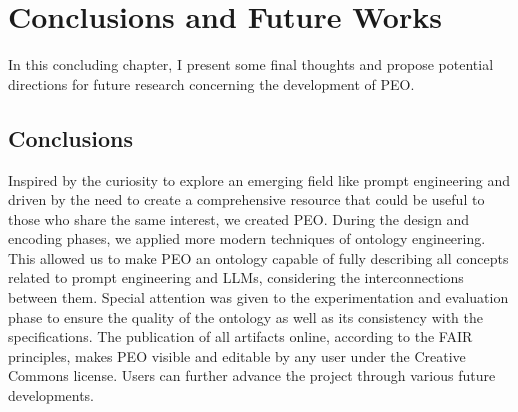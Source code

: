 \chapter{Conclusions and Future Works}
\label{chapter:6_conclusions_future_developments}
In this concluding chapter, I present some final thoughts and propose potential directions for future research concerning the development of PEO.


\section{Conclusions}
\label{section:6_1_conclusions}
Inspired by the curiosity to explore an emerging field like prompt engineering and driven by the need to create a comprehensive resource that could be useful to those who share the same interest, we created PEO. During the design and encoding phases, we applied more modern techniques of ontology engineering. This allowed us to make PEO an ontology capable of fully describing all concepts related to prompt engineering and LLMs, considering the interconnections between them. Special attention was given to the experimentation and evaluation phase to ensure the quality of the ontology as well as its consistency with the specifications. The publication of all artifacts online, according to the FAIR principles, makes PEO visible and editable by any user under the Creative Commons license. Users can further advance the project through various future developments. 

